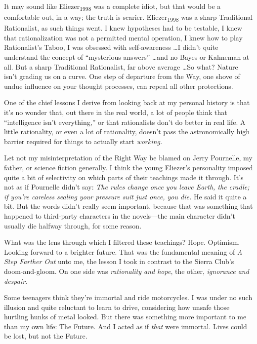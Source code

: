 {
 It may sound like Eliezer\textsubscript{1998} was a complete
idiot, but that would be a comfortable out, in a way; the truth is
scarier. Eliezer\textsubscript{1998} was a sharp Traditional
Rationalist, as such things went. I knew hypotheses had to be testable,
I knew that rationalization was not a permitted mental operation, I
knew how to play Rationalist's Taboo, I was obsessed
with self-awareness \ldots I didn't quite understand the
concept of ``mysterious answers''
\ldots and no Bayes or Kahneman at all. But a sharp Traditional
Rationalist, far above average \ldots So what? Nature
isn't grading us on a curve. One step of departure from
the Way, one shove of undue influence on your thought processes, can
repeal all other protections.}

{
 One of the chief lessons I derive from looking back at my personal
history is that it's no wonder that, out there in the
real world, a lot of people think that ``intelligence
isn't everything,'' or that
rationalists don't do better in real life. A little
rationality, or even a lot of rationality, doesn't pass
the astronomically high barrier required for things to actually start
\textit{working.}}

{
 Let not my misinterpretation of the Right Way be blamed on Jerry
Pournelle, my father, or science fiction generally. I think the young
Eliezer's personality imposed quite a bit of
selectivity on which parts of their teachings made it through.
It's not as if Pournelle didn't say:
\textit{The rules change once you leave Earth, the cradle; if
you're careless sealing your pressure suit just once,
you die.} He said it quite a bit. But the words didn't
really seem important, because that was something that happened to
third-party characters in the novels---the main character
didn't usually die halfway through, for some reason.}

{
 What was the lens through which I filtered these teachings? Hope.
Optimism. Looking forward to a brighter future. That was the
fundamental meaning of \textit{A Step Farther Out} unto me, the lesson
I took in contrast to the Sierra Club's doom-and-gloom.
On one side was \textit{rationality and hope}, the other,
\textit{ignorance and despair}.}

{
 Some teenagers think they're immortal and ride
motorcycles. I was under no such illusion and quite reluctant to learn
to drive, considering how unsafe those hurtling hunks of metal looked.
But there was something more important to me than my own life: The
Future. And I acted as if \textit{that} were immortal. Lives could be
lost, but not the Future.}

